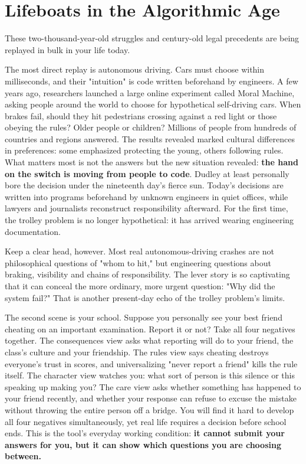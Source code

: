 \section{Lifeboats in the Algorithmic Age}
These two-thousand-year-old struggles and century-old legal precedents are being replayed in bulk in your life today.

The most direct replay is autonomous driving. Cars must choose within milliseconds, and their "intuition" is code written beforehand by engineers. A few years ago, researchers launched a large online experiment called Moral Machine, asking people around the world to choose for hypothetical self-driving cars. When brakes fail, should they hit pedestrians crossing against a red light or those obeying the rules? Older people or children? Millions of people from hundreds of countries and regions answered. The results revealed marked cultural differences in preferences: some emphasized protecting the young, others following rules. What matters most is not the answers but the new situation revealed: \textbf{the hand on the switch is moving from people to code}. Dudley at least personally bore the decision under the nineteenth day's fierce sun. Today's decisions are written into programs beforehand by unknown engineers in quiet offices, while lawyers and journalists reconstruct responsibility afterward. For the first time, the trolley problem is no longer hypothetical: it has arrived wearing engineering documentation.

Keep a clear head, however. Most real autonomous-driving crashes are not philosophical questions of "whom to hit," but engineering questions about braking, visibility and chains of responsibility. The lever story is so captivating that it can conceal the more ordinary, more urgent question: "Why did the system fail?" That is another present-day echo of the trolley problem's limits.

The second scene is your school. Suppose you personally see your best friend cheating on an important examination. Report it or not? Take all four negatives together. The consequences view asks what reporting will do to your friend, the class's culture and your friendship. The rules view says cheating destroys everyone's trust in scores, and universalizing "never report a friend" kills the rule itself. The character view watches you: what sort of person is this silence or this speaking up making you? The care view asks whether something has happened to your friend recently, and whether your response can refuse to excuse the mistake without throwing the entire person off a bridge. You will find it hard to develop all four negatives simultaneously, yet real life requires a decision before school ends. This is the tool's everyday working condition: \textbf{it cannot submit your answers for you, but it can show which questions you are choosing between.}

